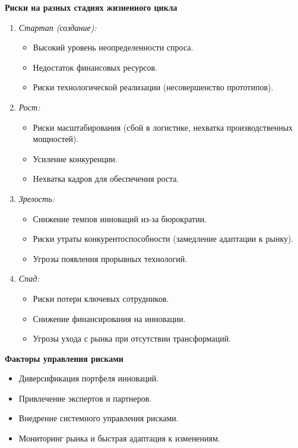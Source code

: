 \textbf{Риски на разных стадиях жизненного цикла}
\begin{enumerate}
    \item \textit{Стартап (создание):}
    \begin{itemize}
        \item Высокий уровень неопределенности спроса.
        \item Недостаток финансовых ресурсов.
        \item Риски технологической реализации (несовершенство прототипов).
    \end{itemize}
    
    \item \textit{Рост:}
    \begin{itemize}
        \item Риски масштабирования (сбой в логистике, нехватка производственных мощностей).
        \item Усиление конкуренции.
        \item Нехватка кадров для обеспечения роста.
    \end{itemize}
    
    \item \textit{Зрелость:}
    \begin{itemize}
        \item Снижение темпов инноваций из-за бюрократии.
        \item Риски утраты конкурентоспособности (замедление адаптации к рынку).
        \item Угрозы появления прорывных технологий.
    \end{itemize}
    
    \item \textit{Спад:}
    \begin{itemize}
        \item Риски потери ключевых сотрудников.
        \item Снижение финансирования на инновации.
        \item Угрозы ухода с рынка при отсутствии трансформаций.
    \end{itemize}
\end{enumerate}

\textbf{Факторы управления рисками}
\begin{itemize}
    \item Диверсификация портфеля инноваций.
    \item Привлечение экспертов и партнеров.
    \item Внедрение системного управления рисками.
    \item Мониторинг рынка и быстрая адаптация к изменениям.
\end{itemize}